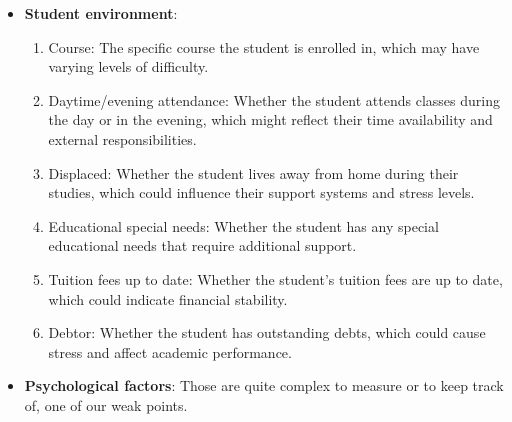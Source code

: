 \documentclass[12pt]{article}
\begin{document}
\begin{itemize}
    \item \textbf{Student environment}:
          \begin{enumerate}
              \item Course: The specific course the student is enrolled in, which may have varying levels of difficulty.
              \item Daytime/evening attendance: Whether the student attends classes during the day or in the evening, which might reflect their time availability and external responsibilities.
              \item Displaced: Whether the student lives away from home during their studies, which could influence their support systems and stress levels.
              \item Educational special needs: Whether the student has any special educational needs that require additional support.
              \item Tuition fees up to date: Whether the student's tuition fees are up to date, which could indicate financial stability.
              \item Debtor: Whether the student has outstanding debts, which could cause stress and affect academic performance.
          \end{enumerate}

    \item \textbf{Psychological factors}: Those are quite complex to measure or to keep track of, one of our weak points.


\end{itemize}
\end{document}
